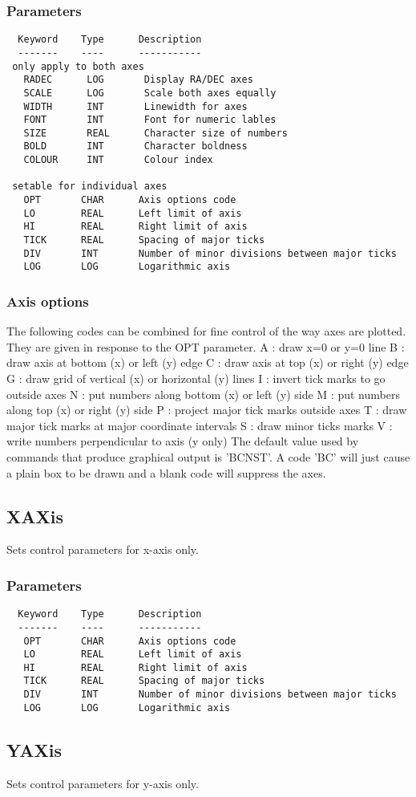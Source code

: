 \documentclass{book}
\renewcommand{\_}{{\tt\char'137}}     %
\begin{document}
\subsubsection{Parameters}
\begin{verbatim}
  Keyword    Type      Description
  -------    ----      -----------
 only apply to both axes
   RADEC      LOG       Display RA/DEC axes
   SCALE      LOG       Scale both axes equally
   WIDTH      INT       Linewidth for axes
   FONT       INT       Font for numeric lables
   SIZE       REAL      Character size of numbers
   BOLD       INT       Character boldness
   COLOUR     INT       Colour index

 setable for individual axes
   OPT       CHAR      Axis options code
   LO        REAL      Left limit of axis
   HI        REAL      Right limit of axis
   TICK      REAL      Spacing of major ticks
   DIV       INT       Number of minor divisions between major ticks
   LOG       LOG       Logarithmic axis
\end{verbatim}\subsubsection{Axis options}
The following codes can be combined for fine control of the way
axes are plotted. They are given in response to the OPT parameter.
A : draw x=0 or y=0 line
B : draw axis at bottom (x) or left (y) edge
C : draw axis at top (x) or right (y) edge
G : draw grid of vertical (x) or horizontal (y) lines
I : invert tick marks to go outside axes
N : put numbers along bottom (x) or left (y) side
M : put numbers along top (x) or right (y) side
P : project major tick marks outside axes
T : draw major tick marks at major coordinate intervals
S : draw minor ticks marks
V : write numbers perpendicular to axis (y only)
The default value used by commands that produce graphical output
is 'BCNST'. A code 'BC' will just cause a plain box to be drawn
and a blank code will suppress the axes.

\subsection{XAXis}
Sets control parameters for x-axis only.

\subsubsection{Parameters}
\begin{verbatim}
  Keyword    Type      Description
  -------    ----      -----------
   OPT       CHAR      Axis options code
   LO        REAL      Left limit of axis
   HI        REAL      Right limit of axis
   TICK      REAL      Spacing of major ticks
   DIV       INT       Number of minor divisions between major ticks
   LOG       LOG       Logarithmic axis
\end{verbatim}\subsection{YAXis}
Sets control parameters for y-axis only.
\end{document}

